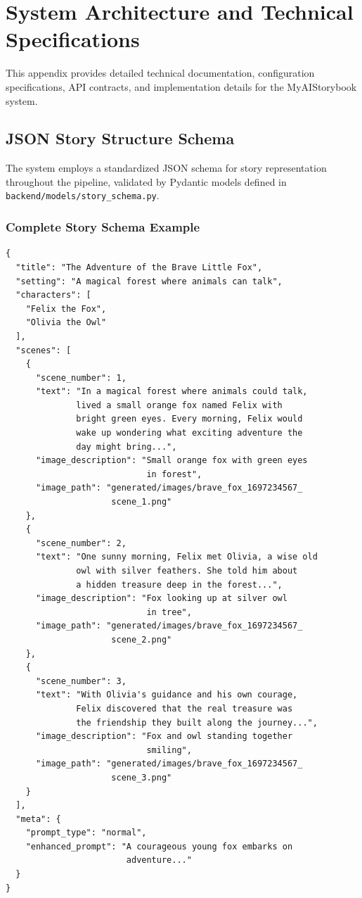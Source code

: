 \appendix
\chapter{System Architecture and Technical Specifications}

This appendix provides detailed technical documentation, configuration specifications, API contracts, and implementation details for the MyAIStorybook system.

\section{JSON Story Structure Schema}

The system employs a standardized JSON schema for story representation throughout the pipeline, validated by Pydantic models defined in \texttt{backend/models/story\_schema.py}.

\subsection{Complete Story Schema Example}

\begin{verbatim}
{
  "title": "The Adventure of the Brave Little Fox",
  "setting": "A magical forest where animals can talk",
  "characters": [
    "Felix the Fox",
    "Olivia the Owl"
  ],
  "scenes": [
    {
      "scene_number": 1,
      "text": "In a magical forest where animals could talk, 
              lived a small orange fox named Felix with 
              bright green eyes. Every morning, Felix would 
              wake up wondering what exciting adventure the 
              day might bring...",
      "image_description": "Small orange fox with green eyes 
                            in forest",
      "image_path": "generated/images/brave_fox_1697234567_
                     scene_1.png"
    },
    {
      "scene_number": 2,
      "text": "One sunny morning, Felix met Olivia, a wise old 
              owl with silver feathers. She told him about 
              a hidden treasure deep in the forest...",
      "image_description": "Fox looking up at silver owl 
                            in tree",
      "image_path": "generated/images/brave_fox_1697234567_
                     scene_2.png"
    },
    {
      "scene_number": 3,
      "text": "With Olivia's guidance and his own courage, 
              Felix discovered that the real treasure was 
              the friendship they built along the journey...",
      "image_description": "Fox and owl standing together 
                            smiling",
      "image_path": "generated/images/brave_fox_1697234567_
                     scene_3.png"
    }
  ],
  "meta": {
    "prompt_type": "normal",
    "enhanced_prompt": "A courageous young fox embarks on 
                        adventure..."
  }
}
\end{verbatim}


